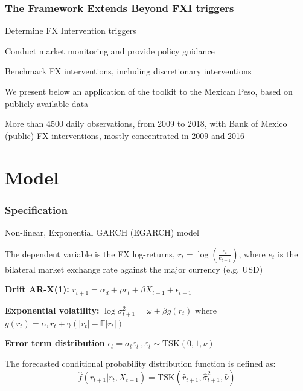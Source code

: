 \documentclass{beamer}
\newenvironment{largeitemize}{\itemize\addtolength{\itemsep}{10pt}}{\enditemize}
\newenvironment{largeenumerate}{\enumerate\addtolength{\itemsep}{10pt}}{\endenumerate}
\begin{document}
\begin{frame}
  \frametitle{The Framework Extends Beyond FXI triggers}    
  \begin{largeenumerate}
    \item Determine FX Intervention triggers
    \item Conduct market monitoring and provide policy guidance
    \item Benchmark FX interventions, including discretionary interventions
    \end{largeenumerate}
    
    \bigskip
    
  \begin{largeitemize}
    \item We present below an application of the toolkit to the Mexican Peso, based on publicly
      available data
    \item More than 4500 daily observations, from 2009 to 2018, with Bank of
      Mexico (public) FX interventions, mostly concentrated in 2009 and 2016
    \end{largeitemize}
    
\end{frame}


\section{Model}

\begin{frame}
  \frametitle{Specification}
\begin{largeitemize}  
\item Non-linear, Exponential GARCH (EGARCH) model 
\item The dependent variable is the FX log-returns, $r_t = \log(\frac{e_t}{e_{t-1}})$, where
$e_t$ is the bilateral market exchange rate against the major currency
(e.g. USD)
\item \textbf{Drift AR-X(1):} $r_{t+1} = \alpha_d +
  \rho r_t + \beta X_{t+1} + \epsilon_{t-1}$\\  
\item \textbf{Exponential volatility:} $\log \sigma_{t+1}^{2} = \omega + \beta
g(r_t)$ where $g(r_t) = \alpha_v r_t + \gamma(|r_t|-\mathbb{E}|r_t|)$

\item \textbf{Error term distribution} $\epsilon_t = \sigma_t \varepsilon_t
  \ , \varepsilon_t \sim \text{TSK}(0, 1,\nu)$\\
  
\item The forecasted conditional probability distribution function is defined as:
      \begin{equation*}
        \hat{f}(r_{t+1} | r_{t}, X_{t+1}) = \text{TSK}(\hat{r}_{t+1},
        \hat{\sigma}_{t+1}^{2}, \hat{\nu})
      \end{equation*}      
\end{largeitemize}
\end{frame}
\end{document}
